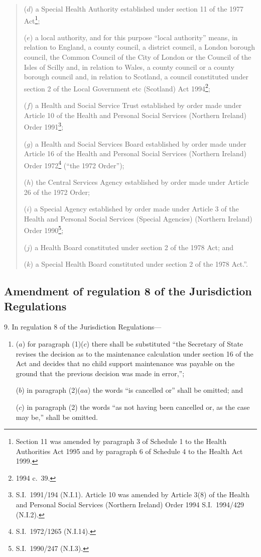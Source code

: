 \documentclass[12pt,a4paper]{article}
\begin{document}
\begin{quotation}
\begin{enumerate}
($d$) a Special Health Authority established under section 11 of the 1977 Act\footnote{Section 11 was amended by paragraph 3 of Schedule 1 to the Health Authorities Act 1995 and by paragraph 6 of Schedule 4 to the Health Act 1999.};

($e$) a local authority, and for this purpose “local authority” means, in relation to England, a county council, a district council, a London borough council, the Common Council of the City of London or the Council of the Isles of Scilly and, in relation to Wales, a county council or a county borough council and, in relation to Scotland, a council constituted under section 2 of the Local Government etc (Scotland) Act 1994\footnote{1994 c.\ 39.};

($f$) a Health and Social Service Trust established by order made under Article 10 of the Health and Personal Social Services (Northern Ireland) Order 1991\footnote{S.I.\ 1991/194 (N.I.1). Article 10 was amended by Article 3(8) of the Health and Personal Social Services (Northern Ireland) Order 1994 S.I.\ 1994/429 (N.I.2).};

($g$) a Health and Social Services Board established by order made under Article 16 of the Health and Personal Social Services (Northern Ireland) Order 1972\footnote{S.I.\ 1972/1265 (N.I.14).} (“the 1972 Order”);

($h$) the Central Services Agency established by order made under Article 26 of the 1972 Order;

($i$) a Special Agency established by order made under Article 3 of the Health and Personal Social Services (Special Agencies) (Northern Ireland) Order 1990\footnote{S.I.\ 1990/247 (N.I.3).};

($j$) a Health Board constituted under section 2 of the 1978 Act; and

($k$) a Special Health Board constituted under section 2 of the 1978 Act.”.
\end{enumerate}
\end{quotation}

\subsection[9. Amendment of regulation 8 of the Jurisdiction Regulations]{Amendment of regulation 8 of the Jurisdiction Regulations}

9.  In regulation 8 of the Jurisdiction Regulations—
\begin{enumerate}\item[]
($a$) for paragraph (1)($c$)  there shall be substituted “the Secretary of State revises the decision as to the maintenance calculation under section 16 of the Act and decides that no child support maintenance was payable on the ground that the previous decision was made in error,”;

($b$) in paragraph (2)($aa$)  the words “is cancelled or” shall be omitted; and

($c$) in paragraph (2) the words “as not having been cancelled or, as the case may be,” shall be omitted.
\end{enumerate}
\end{document}
